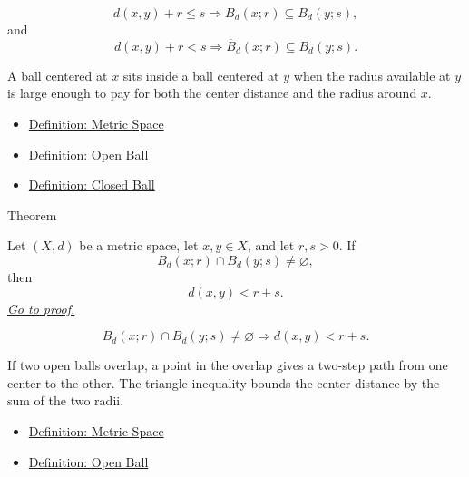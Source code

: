 \begin{remark*}
\[
d(x,y)
+r\leq s
\Longrightarrow
B_d(x;r)\subseteq B_d(y;s),
\]
and
\[
d(x,y)+r<s
\Longrightarrow
\overline{B}_d(x;r)\subseteq B_d(y;s).
\]
\end{remark*}

\begin{remark*}[Interpretation]
A ball centered at \(x\) sits inside a ball centered at \(y\) when the radius
available at \(y\) is large enough to pay for both the center distance and
the radius around \(x\).
\end{remark*}

\begin{dependencies}
\begin{itemize}
  \item \hyperref[def:metric-space]{Definition: Metric Space}
  \item \hyperref[def:metric-open-ball]{Definition: Open Ball}
  \item \hyperref[def:metric-closed-ball]{Definition: Closed Ball}
\end{itemize}
\end{dependencies}

\begin{theorembox}{Theorem}
\begin{theorem}
\label{thm:metric-intersecting-balls-center-distance-bound}
Let \((X,d)\) be a metric space, let \(x,y\in X\), and let \(r,s>0\).  If
\[
  B_d(x;r)\cap B_d(y;s)\neq\varnothing,
\]
then
\[
  d(x,y)<r+s.
\]
\hyperref[prf:metric-intersecting-balls-center-distance-bound]{\textit{Go to proof.}}
\end{theorem}
\end{theorembox}

\begin{remark*}
\[
B_d(x;r)\cap B_d(y;s)\neq\varnothing
\Longrightarrow
d(x,y)<r+s.
\]
\end{remark*}

\begin{remark*}[Interpretation]
If two open balls overlap, a point in the overlap gives a two-step path from
one center to the other.  The triangle inequality bounds the center distance
by the sum of the two radii.
\end{remark*}

\begin{dependencies}
\begin{itemize}
  \item \hyperref[def:metric-space]{Definition: Metric Space}
  \item \hyperref[def:metric-open-ball]{Definition: Open Ball}
\end{itemize}
\end{dependencies}

